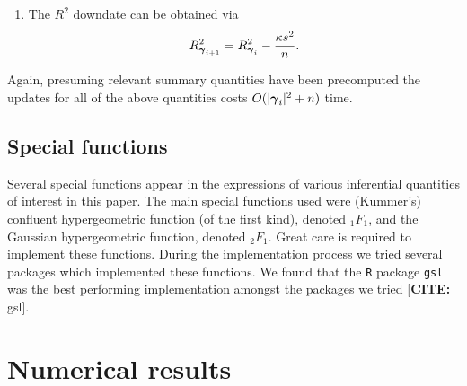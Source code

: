 \documentclass{article}[12pt]
\begin{document}
\begin{enumerate}
	\item 
	The $R^2$ downdate can be obtained
	via
	$$
	R_{{\boldsymbol \gamma}_{i+1}}^2 = R_{{\boldsymbol \gamma}_{i}}^2 - \frac{\kappa s^2}{n}.
	$$
	
	
\end{enumerate}

\noindent Again, presuming relevant summary quantities have been precomputed
the updates for all of the above quantities costs $O(|{\boldsymbol \gamma}_{i}|^2 + n)$ time.

\subsection{Special functions}

Several special functions appear in the expressions of various inferential
quantities of interest in this paper. The main special functions used 
were (Kummer's) confluent hypergeometric function (of the first kind),
denoted ${}_1F_1$, and the Gaussian hypergeometric function, denoted
${}_2 F_1$. Great care is required to implement these functions. During the 
implementation process we tried several packages which implemented these
functions. We found that the {\tt R} package {\tt gsl} was the best performing
implementation amongst the packages we tried
[{\bf CITE:} gsl].
 

\section{Numerical results}
\label{sec:numerical}
\end{document}
